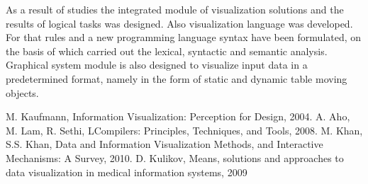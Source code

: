 \documentclass[a4paper, 10pt, conference]{ieeeconf}
\begin{document}
As a result of studies the integrated module of visualization solutions and the results of logical tasks was designed. Also visualization language was developed. For that rules and  a new programming language syntax  have been formulated, on the basis of which carried out the lexical, syntactic and semantic analysis. Graphical system module is also designed to visualize input data in a predetermined format, namely in the form of static and dynamic table moving objects.   

\addtolength{\textheight}{-12cm}

\begin{thebibliography}{99}

 M. Kaufmann, Information Visualization: Perception for Design, 2004.
 A. Aho, M. Lam, R. Sethi, LCompilers: Principles, Techniques, and Tools, 2008.
 M. Khan, S.S. Khan, Data and Information Visualization Methods, and
Interactive Mechanisms: A Survey, 2010.
 D. Kulikov, Means, solutions and approaches to data visualization in medical information systems, 2009

\end{thebibliography}
\end{document}
